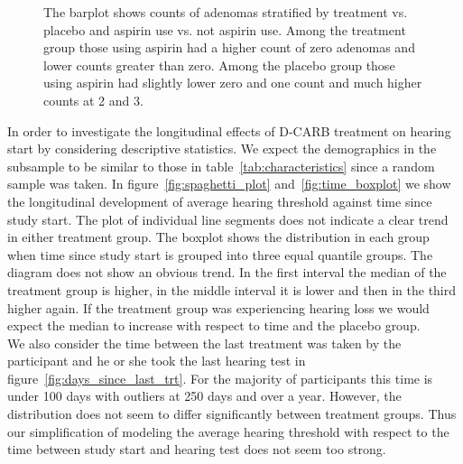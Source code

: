 \documentclass[paper=a4, fontsize=11pt]{scrartcl} %
\numberwithin{equation}{section} %
\numberwithin{figure}{section} %
\numberwithin{table}{section} %
\begin{document}
\begin{figure}[H]
\begin{minipage}[b]{0.38\textwidth}
    \caption{The barplot shows counts of adenomas stratified by treatment vs. placebo and aspirin use vs. not aspirin use. Among the treatment group those using aspirin had a higher count of zero adenomas and lower counts greater than zero. Among the placebo group those using aspirin had slightly lower zero and one count and much higher counts at 2 and 3.}
    \label{fig:counts_stratified_aspirin}
  \end{minipage}
\end{figure}

In order to investigate the longitudinal effects of D-CARB treatment on hearing start by considering descriptive statistics. We expect the demographics in the subsample to be similar to those in table~\ref{tab:characteristics} since a random sample was taken.
In figure~\ref{fig:spaghetti_plot} and~\ref{fig:time_boxplot} we show the longitudinal development of average hearing threshold against time since study start. The plot of individual line segments does not indicate a clear trend in either treatment group. The boxplot shows the distribution in each group when time since study start is grouped into three equal quantile groups. The diagram does not show an obvious trend. In the first interval the median of the treatment group is higher, in the middle interval it is lower and then in the third higher again. If the treatment group was experiencing hearing loss we would expect the median to increase with respect to time and the placebo group.\\
We also consider the time between the last treatment was taken by the participant and he or she took the last hearing test in figure~\ref{fig:days_since_last_trt}. For the majority of participants this time is under 100 days with outliers at 250 days and over a year. However, the distribution does not seem to differ significantly between treatment groups. Thus our simplification of modeling the average hearing threshold with respect to the time between study start and hearing test does not seem too strong.
\end{document}
